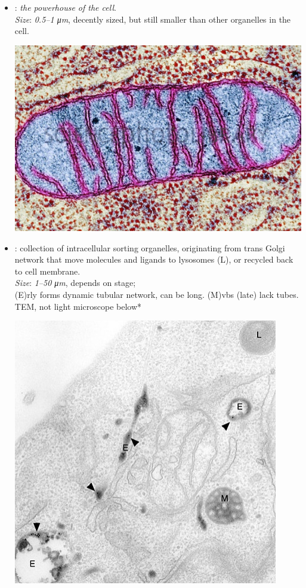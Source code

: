 \begin{multicols}{2}
\begin{itemize}
\begin{center}
  \end{center}
  \item {}: \small{\textit{the powerhouse of the cell}}. \\
  \textit{Size}: \emph{0.5--1 \si{\micro m}}, decently sized, but still smaller than other organelles in the cell.
  \begin{center}
    \hspace{-30pt}\includegraphics[width=0.75\columnwidth]{images/week-1-powerhouse.jpg}
  \end{center}
  \item {}: collection of intracellular sorting organelles, originating from trans Golgi network that move molecules and ligands to lysosomes (L), or recycled back to cell membrane.\\
  \textit{Size}: \emph{1--50 \si{\micro m}}, depends on stage;\\
  (E)rly forms dynamic tubular network, can be long. %
  (M)vbs (late) lack tubes.\\ %
  TEM, not light microscope below*
  \begin{center}
    \hspace{-30pt}\includegraphics[width=0.75\columnwidth]{images/week-1-endosome.jpg}

\end{center}
\end{itemize}
\end{multicols}
